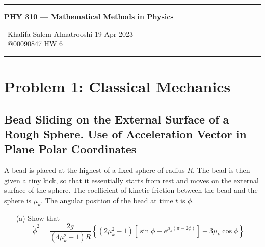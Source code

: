 \documentclass{article}
\begin{document}
	
	\begin{center}
		\hrule
		\vspace{0.4cm}
		{\textbf { \large PHY 310 --- Mathematical Methods in Physics}}
		\vspace{0.4cm}
	\end{center}
	{ \ Khalifa Salem Almatrooshi \hspace{\fill}  19 Apr 2023 \\
		{ } \ @00090847 \hspace{\fill}  HW 6 \\
		\hrule	
	
	\section*{Problem 1: Classical Mechanics}
	\subsection*{Bead Sliding on the External Surface of a Rough Sphere. Use of Acceleration Vector in Plane Polar Coordinates}
	\boldmath
		A bead is placed at the highest of a fixed sphere of radius $R$. The bead is then given a tiny kick, so that it essentially starts from rest and moves on the external surface of the sphere. The coefficient of kinetic friction between the bead and the sphere is $\mu_k$. The angular position of the bead at time $t$ is $\phi$. \\
		
		\begin{enumerate}
			\item[(a)] Show that
			\[
				\dot{\phi}^2 = \frac{2g}{(4\mu^2_k + 1)R} \left\{ (2\mu^2_k - 1) \left[ \sin \phi - e^{\mu_k (\pi - 2\phi)} \right] - 3\mu_k \cos \phi \right\}
			\]

\end{enumerate}}
\end{document}
